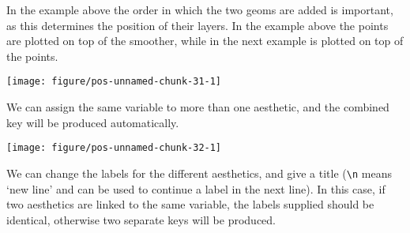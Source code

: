 \documentclass[paper=a4,headsepline,BCOR=12mm,twoside,open=right,%
titlepage,headings=small,fontsize=10pt,index=totoc,bibliography=totoc,%
captions=tableheading,captions=nooneline]{scrbook}\usepackage{knitr}
\begin{document}
In the example above the order in which the two geoms are added is important, as this determines the position of their layers. In the example above the points are plotted on top of the smoother, while in the next example  is plotted on top of the points.

\begin{knitrout}\footnotesize
{}\color{fgcolor}\begin{kframe}
\begin{alltt}
\hlstd{(}  \hlstd{(}  \hlstd{=} \hlopt{+}
  \hlstd{()} \hlopt{+}
  \hlstd{(}\hlstd{=}\hlstd{)}
\end{alltt}
\end{kframe}

{\centering \texttt{[image: figure/pos-unnamed-chunk-31-1]} 

}



\end{knitrout}

We can assign the same variable to more than one aesthetic, and the combined key will be produced automatically.

\begin{knitrout}\footnotesize
{}\color{fgcolor}\begin{kframe}
\begin{alltt}
\hlstd{(} 
       \hlstd{(}  \hlstd{=}
           \hlstd{=} \hlopt{+}
  \hlstd{()}
\end{alltt}
\end{kframe}

{\centering \texttt{[image: figure/pos-unnamed-chunk-32-1]} 

}



\end{knitrout}

We can change the labels for the different aesthetics, and give a title (\verb!\n! means `new line' and can be used to continue a label in the next line). In this case, if two aesthetics are linked to the same variable, the labels supplied should be identical, otherwise two separate keys will be produced.
\end{document}
